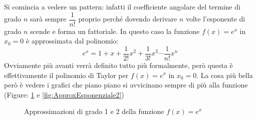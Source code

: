 Si comincia a vedere un pattern: infatti il coefficiente angolare del termine di grado $n$ sarà sempre $\dfrac{1}{n!}$ proprio perché dovendo derivare $n$ volte l'esponente di grado $n$ scende e forma un fattoriale. In questo caso la funzione $f(x) = e^x$ in $x_0 = 0$ è approssimata dal polinomio:
\begin{equation*}
	e^x = 1 + x + \dfrac{1}{2!}x^2 + \dfrac{1}{3!} x^3 \cdots \dfrac{1}{n!} x^n
\end{equation*}
Ovviamente più avanti verrà definito tutto più formalmente, però questa è effettivamente il polinomio di Taylor per $f(x) = e^x$ in $x_0 = 0$. La cosa più bella però è vedere i grafici che piano piano si avvicinano sempre di più alla funzione (Figure: \ref{fig:ApproxEsponenziale1} e \ref{fig:ApproxEsponenziale2})

\begin{figure}
\centering
\begin{subfigure}{0.49\textwidth}
\centering
\end{subfigure}
\begin{subfigure}{0.49\textwidth}
\centering
\end{subfigure}
	\caption{Approssimazioni di grado 1 e 2 della funzione $f(x) = e^x$} 
\label{fig:ApproxEsponenziale1}
\end{figure}


